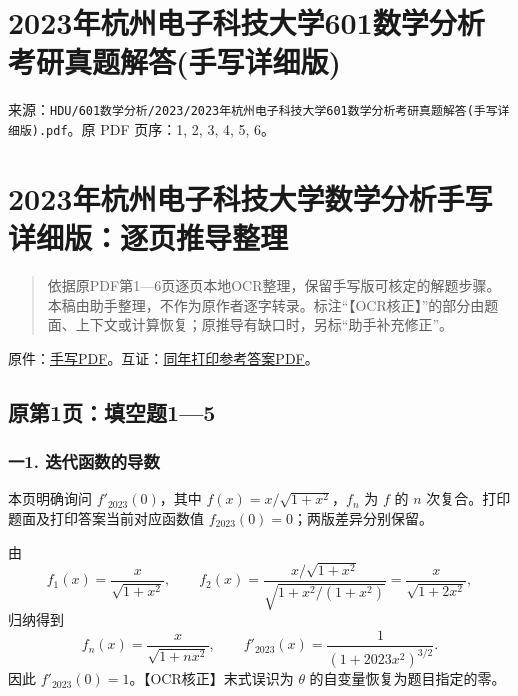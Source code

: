 \documentclass[11pt,fontset=fandol]{ctexart}
\begin{document}
\section{2023年杭州电子科技大学601数学分析考研真题解答(手写详细版)}\label{ux5e74ux676dux5ddeux7535ux5b50ux79d1ux6280ux5927ux5b66601ux6570ux5b66ux5206ux6790ux8003ux7814ux771fux9898ux89e3ux7b54ux624bux5199ux8be6ux7ec6ux7248}

来源：\texttt{HDU/601数学分析/2023/2023年杭州电子科技大学601数学分析考研真题解答(手写详细版).pdf}。原
PDF 页序：1, 2, 3, 4, 5, 6。

\section{2023年杭州电子科技大学数学分析手写详细版：逐页推导整理}\label{ux5e74ux676dux5ddeux7535ux5b50ux79d1ux6280ux5927ux5b66ux6570ux5b66ux5206ux6790ux624bux5199ux8be6ux7ec6ux7248ux9010ux9875ux63a8ux5bfcux6574ux7406}

\begin{quote}
依据原PDF第1---6页逐页本地OCR整理，保留手写版可核定的解题步骤。本稿由助手整理，不作为原作者逐字转录。标注``【OCR核正】''的部分由题面、上下文或计算恢复；原推导有缺口时，另标``助手补充修正''。
\end{quote}

原件：\href{/Users/oyamahappa/Documents/Agent/Codex/HDU/601数学分析/2023/2023年杭州电子科技大学601数学分析考研真题解答(手写详细版).pdf}{手写PDF}。互证：\href{/Users/oyamahappa/Documents/Agent/Codex/HDU/601数学分析/2023/2023年杭州电子科技大学601数学分析考研真题参考答案.pdf}{同年打印参考答案PDF}。

\subsection{原第1页：填空题1---5}\label{ux539fux7b2c1ux9875ux586bux7a7aux989815}

\subsubsection{一1.
迭代函数的导数}\label{ux4e001.-ux8fedux4ee3ux51fdux6570ux7684ux5bfcux6570}

本页明确询问 \(f'_{2023}(0)\)，其中 \(f(x)=x/\sqrt{1+x^2}\)，\(f_n\) 为
\(f\) 的 \(n\) 次复合。打印题面及打印答案当前对应函数值
\(f_{2023}(0)=0\)；两版差异分别保留。

由 \[
f_1(x)=\frac{x}{\sqrt{1+x^2}},\qquad
f_2(x)=\frac{x/\sqrt{1+x^2}}{\sqrt{1+x^2/(1+x^2)}}=\frac{x}{\sqrt{1+2x^2}},
\] 归纳得到 \[
f_n(x)=\frac{x}{\sqrt{1+nx^2}},\qquad
f'_{2023}(x)=\frac1{(1+2023x^2)^{3/2}}.
\] 因此 \(f'_{2023}(0)=1\)。【OCR核正】末式误识为 \(\theta\)
的自变量恢复为题目指定的零。
\end{document}
